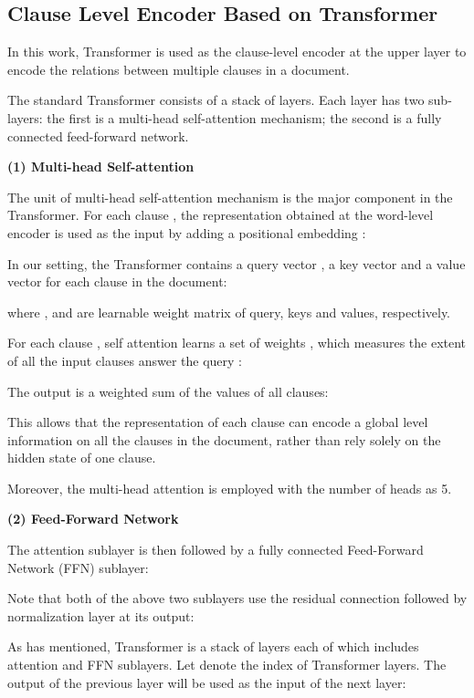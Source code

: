 \documentclass{article}
\begin{document}
\subsection{Clause Level Encoder Based on Transformer}
In this work, Transformer \cite{vaswani2017attention} is used as the clause-level encoder at the upper layer to encode the relations between multiple clauses in a document.

The standard Transformer consists of a stack of  layers. Each layer has two sub-layers: the first is a multi-head self-attention mechanism; the second is a fully connected feed-forward network.

\begin{spacing}{1.3}
\noindent\textbf{(1) Multi-head Self-attention}
\end{spacing}
\noindent The unit of multi-head self-attention mechanism is the major component in the Transformer. For each clause , the representation  obtained at the word-level encoder is used as the input  by adding a positional embedding :


In our setting, the Transformer contains a query vector , a key vector  and a value vector  for each clause  in the document:

\noindent where ,  and  are learnable weight matrix of query, keys and values, respectively.

For each clause , self attention learns a set of weights , which measures the extent of all the input clauses  answer the query :

The output is a weighted sum of the values of all clauses:

This allows that the representation of each clause can encode a global level information on all the clauses in the document, rather than rely solely on the hidden state of one clause.

Moreover, the multi-head attention is employed with the number of heads as 5.

\begin{spacing}{1.3}
\noindent\textbf{(2) Feed-Forward Network}
\end{spacing}
\noindent The attention sublayer is then followed by a fully connected Feed-Forward Network (FFN) sublayer:


Note that both of the above two sublayers use the residual connection followed by normalization layer at its output:


As has mentioned, Transformer is a stack of  layers each of which includes attention and FFN sublayers. Let  denote the index of Transformer layers. The output of the previous layer will be used as the input of the next layer:
\end{document}
